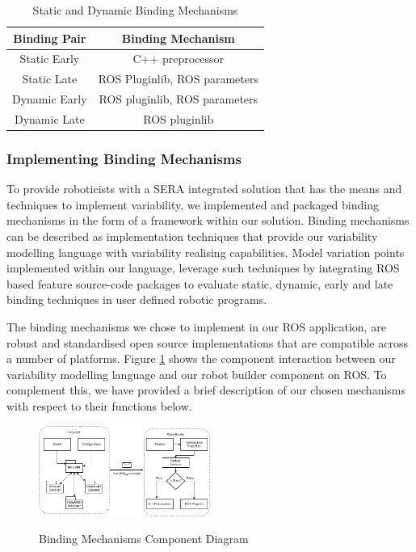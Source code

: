\documentclass[conference]{IEEEtran}
\begin{document}
\begin{table}[H]
	\caption{Static and Dynamic Binding Mechanisms}
	\begin{center}
		\begin{tabular}{|c|c|}
			\hline
			Binding Pair & Binding Mechanism \\ \hline
			Static Early & C++ preprocessor \\ \hline
			Static Late &  ROS Pluginlib, ROS parameters  \\ \hline
			Dynamic Early &  ROS pluginlib, ROS parameters  \\ \hline
			Dynamic Late &  ROS pluginlib  \\ \hline
			
		\end{tabular}
		\label{tab:realmecha}
	\end{center}
\end{table}


\subsubsection{Implementing Binding Mechanisms}
To provide roboticists with a SERA integrated solution that has the means
and techniques to implement variability, we implemented and packaged binding mechanisms in the form of a framework within our solution. Binding mechanisms can be described as implementation techniques that provide our variability modelling language with variability realising capabilities. Model variation points implemented within our language, leverage such techniques by integrating ROS based feature source-code packages to evaluate static, dynamic, early and late binding techniques in user defined robotic programs.

The binding mechanisms we chose to implement in our ROS application, are robust and standardised open source implementations that are compatible across a number of platforms. Figure \ref{mecha-compo} shows the component interaction between our variability modelling language and our robot builder component on ROS. To complement this, we have provided a brief description of our chosen mechanisms with respect to their functions below.

\begin{figure}[H]
	\caption{Binding Mechanisms Component Diagram}
	\centering
	\includegraphics[width=0.5\textwidth]{diagrams/mecha-compo.png}
	\label{mecha-compo}
\end{figure}
\end{document}

